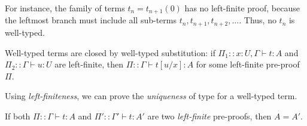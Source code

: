For instance, the family of terms $t_n = t_{n+1}(0)$ has no left-finite proof,
because the leftmost branch must include all sub-terms $t_n, t_{n+1}, t_{n+2}, \ldots$.
Thus, no $t_n$ is well-typed.


\begin{proposition}
Well-typed terms are closed by well-typed substitution:
if $\Pi_1:: x:U, \Gamma \vdash t:A$ and $\Pi_2:: \Gamma \vdash u:U$
are left-finite,
then $\Pi::\Gamma \vdash t[u/x]:A$ for some left-finite pre-proof $\Pi$.
\end{proposition}

%
%

Using \emph{left-finiteness}, we can prove the \emph{uniqueness} of type for a well-typed term. 


\begin{proposition}
\label{proposition-left-finite-unique}
If both $\Pi::\Gamma \vdash t:A$ and $\Pi'::\Gamma' \vdash t:A'$ are two \emph{left-finite} pre-proofs,
then $A = A'$.
\end{proposition}

